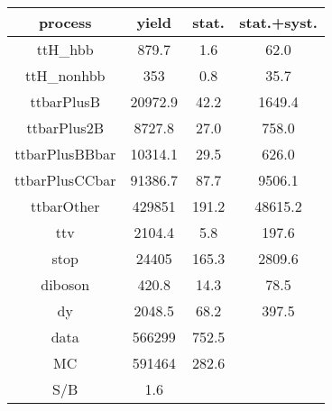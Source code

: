 \begin{tabular}{cccc}
\hline
    process     &  yield  &  stat.  &  stat.+syst.  \\
\hline
    ttH\_hbb     &  879.7  &   1.6   &     62.0      \\
   ttH\_nonhbb   &   353   &   0.8   &     35.7      \\
   ttbarPlusB   & 20972.9 &  42.2   &    1649.4     \\
  ttbarPlus2B   & 8727.8  &  27.0   &     758.0     \\
 ttbarPlusBBbar & 10314.1 &  29.5   &     626.0     \\
 ttbarPlusCCbar & 91386.7 &  87.7   &    9506.1     \\
   ttbarOther   & 429851  &  191.2  &    48615.2    \\
      ttv       & 2104.4  &   5.8   &     197.6     \\
      stop      &  24405  &  165.3  &    2809.6     \\
    diboson     &  420.8  &  14.3   &     78.5      \\
       dy       & 2048.5  &  68.2   &     397.5     \\
\hline
      data      & 566299  &  752.5  &               \\
       MC       & 591464  &  282.6  &               \\
\hline
      S/B       &   1.6   &         &               \\
\hline
\end{tabular}
